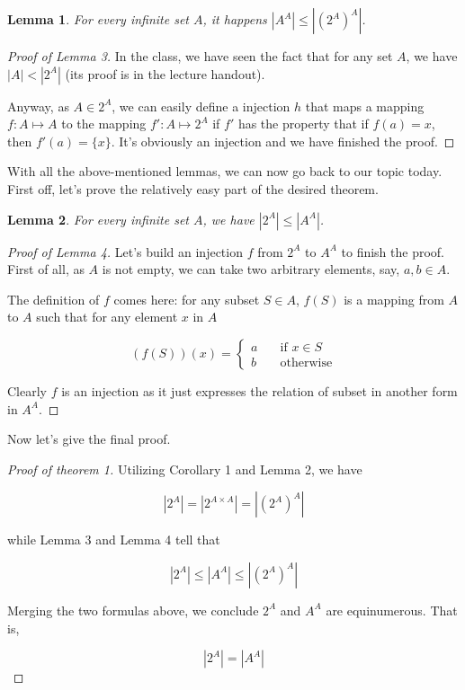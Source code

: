 \documentclass{article}
\newtheorem{lemma}{Lemma}
\begin{document}
\begin{lemma}
	For every infinite set $A$, it happens $|A^A|\le|(2^A)^A|$.
\end{lemma}

\begin{proof}[Proof of Lemma 3]
	In the class, we have seen the fact that for any set $A$, we have $|A|<|2^A|$ (its proof is in the lecture handout).
	
	Anyway, as $A\in 2^A$, we can easily define a injection $h$ that maps a mapping $f:A\mapsto A$ to the mapping $f':A\mapsto 2^A$ if $f'$ has the property that if $f(a)=x$, then $f'(a)=\{x\}$. It's obviously an injection and we have finished the proof.
\end{proof}

With all the above-mentioned lemmas, we can now go back to our topic today. First off, let's prove the relatively easy part of the desired theorem.

\begin{lemma}
	For every infinite set $A$, we have $|2^A|\le |A^A|$.
\end{lemma}

\begin{proof}[Proof of Lemma 4]
	
	Let's build an injection $f$ from $2^A$ to $A^A$ to finish the proof. First of all, as $A$ is not empty, we can take two arbitrary elements, say, $a,b\in A$.
	
	The definition of $f$ comes here: for any subset $S\in A$, $f(S)$ is a mapping from $A$ to $A$ such that for any element $x$ in $A$
	
	$$ (f(S))(x)=\left\{
	\begin{aligned}
	a &\quad\text{if   } x\in S \\
	b &\quad\text{otherwise}
	\end{aligned}
	\right.
	$$
	
	Clearly $f$ is an injection as it just expresses the relation of subset in another form in $A^A$.
	
\end{proof}

Now let's give the final proof.

\begin{proof}[Proof of theorem 1]
	
	Utilizing Corollary 1 and Lemma 2, we have
	
	$$|2^A|=|2^{A\times A}|=|(2^A)^ A|$$
	
	while Lemma 3 and Lemma 4 tell that
	
	$$|2^A|\le |A^A|\le |(2^A)^A|$$
	
	Merging the two formulas above, we conclude $2^A$ and $A^A$ are equinumerous. That is, 
	
	$$|2^A|=|A^A|$$
	
\end{proof}
\end{document}
